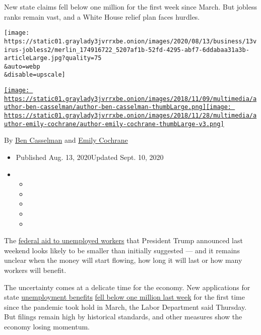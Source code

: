 New state claims fell below one million for the first week since March.
But jobless ranks remain vast, and a White House relief plan faces
hurdles.

\texttt{[image: https://static01.graylady3jvrrxbe.onion/images/2020/08/13/business/13virus-jobless2/merlin\_174916722\_5207af1b-52fd-4295-abf7-6ddabaa31a3b-articleLarge.jpg?quality=75\\\&auto=webp\\\&disable=upscale]}

\href{https://www.nytimes3xbfgragh.onion/by/ben-casselman}{\texttt{[image: https://static01.graylady3jvrrxbe.onion/images/2018/11/09/multimedia/author-ben-casselman/author-ben-casselman-thumbLarge.png]}}\href{https://www.nytimes3xbfgragh.onion/by/emily-cochrane}{\texttt{[image: https://static01.graylady3jvrrxbe.onion/images/2018/11/28/multimedia/author-emily-cochrane/author-emily-cochrane-thumbLarge-v3.png]}}

By \href{https://www.nytimes3xbfgragh.onion/by/ben-casselman}{Ben
Casselman} and
\href{https://www.nytimes3xbfgragh.onion/by/emily-cochrane}{Emily
Cochrane}

\begin{itemize}
\item
  Published Aug. 13, 2020Updated Sept. 10, 2020
\item
  \begin{itemize}
  \item
  \item
  \item
  \item
  \item
  \end{itemize}
\end{itemize}

The
\href{https://www.nytimes3xbfgragh.onion/2020/08/08/us/politics/trump-stimulus-bill-coronavirus.html}{federal
aid to unemployed workers} that President Trump announced last weekend
looks likely to be smaller than initially suggested --- and it remains
unclear when the money will start flowing, how long it will last or how
many workers will benefit.

The uncertainty comes at a delicate time for the economy. New
applications for state
\href{https://www.nytimes3xbfgragh.onion/article/stimulus-unemployment-payment-benefi.html}{unemployment
benefits}
\href{https://www.nytimes3xbfgragh.onion/live/2020/08/13/business/stock-market-today-coronavirus/963000-filed-state-unemployment-claims-last-week-but-layoffs-remained-high}{fell
below one million last week} for the first time since the pandemic took
hold in March, the Labor Department said Thursday. But filings remain
high by historical standards, and other measures show the economy losing
momentum.

